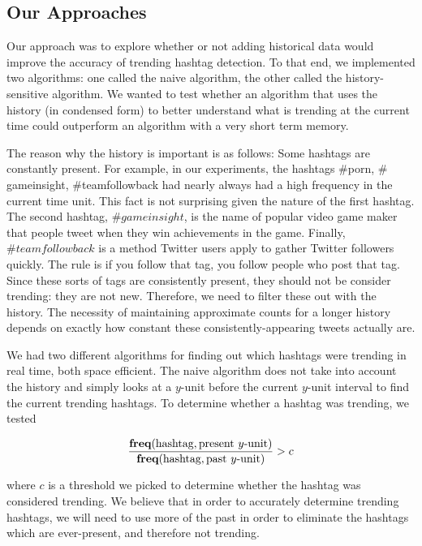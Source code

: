 \documentclass[twoside]{article}
\begin{document}
{\subsection{Our Approaches}

Our approach was to explore whether or not adding historical data would improve the accuracy of 
trending hashtag detection. To that end, we implemented two algorithms: one called the naive algorithm, the other called the history-sensitive algorithm. We wanted to test whether an algorithm that uses
the history (in condensed form) to better understand what is trending at the current time could outperform an algorithm with a very short term memory. 

The reason why the history is important is as follows: Some hashtags are constantly present. For example, in our experiments, the hashtags $\#$porn, $\#$gameinsight, $\#$teamfollowback had nearly always had a high frequency in the current time unit. This fact is not surprising given the nature of the first hashtag. The second hashtag, $\#gameinsight$, is the name of popular video game maker that people tweet when they win achievements in the game. Finally, $\#teamfollowback$ is a method Twitter users apply to gather Twitter followers quickly. The rule is if you follow that tag, you follow people who post that tag. Since these sorts of tags are consistently present, they should not be consider trending: they are not new. Therefore, we need to filter these out with the history.
The necessity of maintaining approximate counts for a longer history depends on exactly how constant these consistently-appearing tweets actually are. 

We had two different algorithms for finding out which hashtags were trending in real time, both space efficient.
The naive algorithm does not take into account the history and simply looks at a $y$-unit before the current $y$-unit interval to find the current trending hashtags. To determine whether a hashtag was trending, we tested

\begin{equation}
\label{eq:threshold}
\frac{\textbf{freq}(\textnormal{hashtag}, \textnormal{present } y \textnormal{-unit})}{\textbf{freq}(\textnormal{hashtag}, \textnormal{past } y \textnormal{-unit})} > c
\end{equation}

where $c$ is a threshold we picked to determine whether the hashtag was considered trending. We believe that in order to accurately determine trending hashtags, we will need to use more of the past in order to eliminate the hashtags which are ever-present, and therefore not trending. 


}
\end{document}
